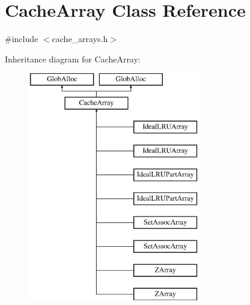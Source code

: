 \hypertarget{classCacheArray}{\section{Cache\-Array Class Reference}
\label{classCacheArray}
}


{\ttfamily \#include $<$cache\-\_\-arrays.\-h$>$}

Inheritance diagram for Cache\-Array\-:\begin{figure}[H]
\begin{center}
\leavevmode
\includegraphics[height=10.000000cm]{classCacheArray}
\end{center}
\end{figure}
